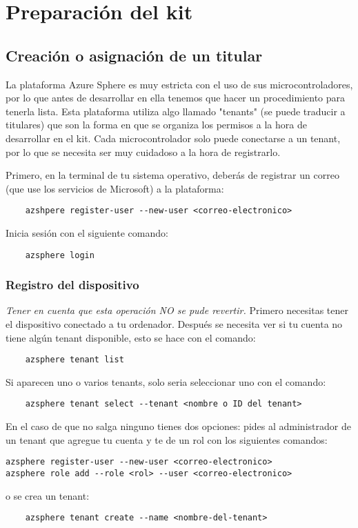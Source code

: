 \section{Preparación del kit}
\subsection{Creación o asignación de un titular}
La plataforma Azure Sphere es muy estricta con el uso de sus microcontroladores, por lo que antes de desarrollar en ella tenemos que hacer un procedimiento para tenerla lista. Esta plataforma utiliza algo llamado "tenants" (se puede traducir a titulares) que son la forma en que se organiza los permisos a la hora de desarrollar en el kit. Cada microcontrolador solo puede conectarse a un tenant, por lo que se necesita ser muy cuidadoso a la hora de registrarlo.

Primero, en la terminal de tu sistema operativo, deberás de registrar un correo (que use los servicios de Microsoft) a la plataforma: 
\begin{verbatim}
	azshpere register-user --new-user <correo-electronico>
\end{verbatim}

Inicia sesión con el siguiente comando:
\begin{verbatim}
	azsphere login
\end{verbatim}

\subsubsection{Registro del dispositivo}
\textit{Tener en cuenta que esta operación NO se pude revertir.}
\linebreak
\linebreak
Primero necesitas tener el dispositivo conectado a tu ordenador. Después se necesita ver si tu cuenta no tiene algún tenant disponible, esto se hace con el comando:
\begin{verbatim}
	azsphere tenant list
\end{verbatim}
Si aparecen uno o varios tenants, solo seria seleccionar uno con el comando:
\begin{verbatim}
	azsphere tenant select --tenant <nombre o ID del tenant>
\end{verbatim}

En el caso de que no salga ninguno tienes dos opciones: pides al administrador de un tenant que agregue tu cuenta y te de un rol con los siguientes comandos:
\begin{verbatim}
azsphere register-user --new-user <correo-electronico>
azsphere role add --role <rol> --user <correo-electronico>
\end{verbatim}
o se crea un tenant:
\begin{verbatim}
	azsphere tenant create --name <nombre-del-tenant>
\end{verbatim}


